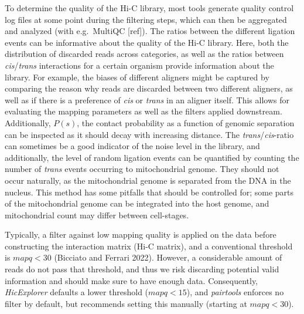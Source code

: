 \documentclass[
  11pt,
  a4paper,
]{scrbook}
\let\oldemph\emph
\renewcommand\emph[1]{\oldemph{\color{gray}#1}}
\begin{document}
To determine the quality of the Hi-C library, most tools generate
quality control log files at some point during the filtering steps,
which can then be aggregated and analyzed (with e.g.~MultiQC {[}ref{]}).
The ratios between the different ligation events can be informative
about the quality of the Hi-C library. Here, both the distribution of
discarded reads across categories, as well as the ratios between
\emph{cis}/\emph{trans} interactions for a certain organism provide
information about the library. For example, the biases of different
aligners might be captured by comparing the reason why reads are
discarded between two different aligners, as well as if there is a
preference of \emph{cis} or \emph{trans} in an aligner itself. This
allows for evaluating the mapping parameters as well as the filters
applied downstream. Additionally, \(P(s)\), the contact probability as a
function of genomic separation can be inspected as it should decay with
increasing distance. The \emph{trans}/\emph{cis}-ratio can sometimes be
a good indicator of the noise level in the library, and additionally,
the level of random ligation events can be quantified by counting the
number of \emph{trans} events occurring to mitochondrial genome. They
should not occur naturally, as the mitochondrial genome is separated
from the DNA in the nucleus. This method has some pitfalls that should
be controlled for; some parts of the mitochondrial genome can be
integrated into the host genome, and mitochondrial count may differ
between cell-stages.

Typically, a filter against low mapping quality is applied on the data
before constructing the interaction matrix (Hi-C matrix), and a
conventional threshold is \(mapq < 30\) (Bicciato and Ferrari 2022).
However, a considerable amount of reads do not pass that threshold, and
thus we risk discarding potential valid information and should make sure
to have enough data. Consequently, \emph{HicExplorer} defaults a lower
threshold (\(mapq < 15\)), and \emph{pairtools} enforces no filter by
default, but recommends setting this manually (starting at
\(mapq < 30\)).
\end{document}
